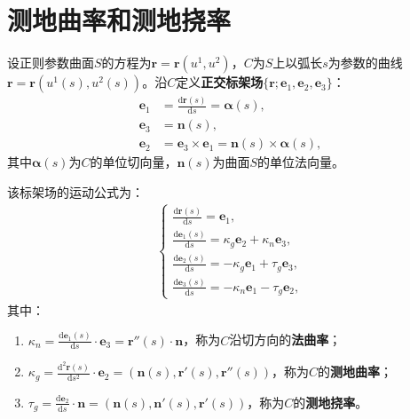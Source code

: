 \documentclass[../../main.tex]{subfiles}%
\begin{document}
\section{测地曲率和测地挠率}

\begin{definition}
设正则参数曲面$S$的方程为$\boldsymbol{r}=\boldsymbol{r}(u^1,u^2)$，$C$为$S$上以弧长$s$为参数的曲线$\boldsymbol{r}=\boldsymbol{r}(u^1(s),u^2(s))$。沿$C$定义\textbf{正交标架场}$\{\boldsymbol{r};\boldsymbol{e}_1,\boldsymbol{e}_2,\boldsymbol{e}_3\}$：
\begin{align}
\boldsymbol{e}_1&=\frac{\mathrm{d}\boldsymbol{r}(s)}{\mathrm{d}s}=\boldsymbol{\alpha}(s),\label{eq:e1}\\
\boldsymbol{e}_3&=\boldsymbol{n}(s),\label{eq:e3}\\
\boldsymbol{e}_2&=\boldsymbol{e}_3\times\boldsymbol{e}_1=\boldsymbol{n}(s)\times\boldsymbol{\alpha}(s),\label{eq:e2}
\end{align}
其中$\boldsymbol{\alpha}(s)$为$C$的单位切向量，$\boldsymbol{n}(s)$为曲面$S$的单位法向量。

该标架场的运动公式为：
\begin{align}
\begin{cases}
\displaystyle\frac{\mathrm{d}\boldsymbol{r}(s)}{\mathrm{d}s}=\boldsymbol{e}_1,\\
\displaystyle\frac{\mathrm{d}\boldsymbol{e}_1(s)}{\mathrm{d}s}=\kappa_g\boldsymbol{e}_2+\kappa_n\boldsymbol{e}_3,\\
\displaystyle\frac{\mathrm{d}\boldsymbol{e}_2(s)}{\mathrm{d}s}=-\kappa_g\boldsymbol{e}_1+\tau_g\boldsymbol{e}_3,\\
\displaystyle\frac{\mathrm{d}\boldsymbol{e}_3(s)}{\mathrm{d}s}=-\kappa_n\boldsymbol{e}_1-\tau_g\boldsymbol{e}_2,
\end{cases}\label{eq:moveformula}
\end{align}
其中：
\begin{enumerate}[(1)]
\item $\kappa_n=\frac{\mathrm{d}\boldsymbol{e}_1(s)}{\mathrm{d}s}\cdot\boldsymbol{e}_3=\boldsymbol{r}''(s)\cdot\boldsymbol{n}$，称为$C$沿切方向的\textbf{法曲率}；
\item $\kappa_g=\frac{\mathrm{d}^2\boldsymbol{r}(s)}{\mathrm{d}s^2}\cdot\boldsymbol{e}_2=(\boldsymbol{n}(s),\boldsymbol{r}'(s),\boldsymbol{r}''(s))$，称为$C$的\textbf{测地曲率}；
\item $\tau_g=\frac{\mathrm{d}\boldsymbol{e}_2}{\mathrm{d}s}\cdot\boldsymbol{n}=(\boldsymbol{n}(s),\boldsymbol{n}'(s),\boldsymbol{r}'(s))$，称为$C$的\textbf{测地挠率}。
\end{enumerate}
\end{definition}
\end{document}
